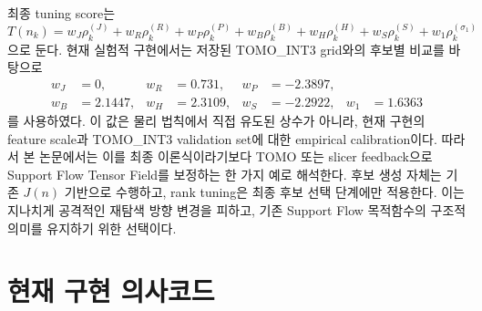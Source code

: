 \documentclass[11pt,a4paper]{article}
\begin{document}
최종 tuning score는
\begin{equation}
T(n_k)
=
w_J\rho^{(J)}_k
+w_R\rho^{(R)}_k
+w_P\rho^{(P)}_k
+w_B\rho^{(B)}_k
+w_H\rho^{(H)}_k
+w_S\rho^{(S)}_k
+w_1\rho^{(\sigma_1)}_k
\end{equation}
으로 둔다.
현재 실험적 구현에서는 저장된 TOMO\_INT3 grid와의 후보별 비교를 바탕으로
\begin{equation}
\begin{aligned}
w_J&=0, &
w_R&=0.731, &
w_P&=-2.3897,\\
w_B&=2.1447, &
w_H&=2.3109, &
w_S&=-2.2922, &
w_1&=1.6363
\end{aligned}
\end{equation}
를 사용하였다.
이 값은 물리 법칙에서 직접 유도된 상수가 아니라,
현재 구현의 feature scale과 TOMO\_INT3 validation set에 대한 empirical calibration이다.
따라서 본 논문에서는 이를 최종 이론식이라기보다
TOMO 또는 slicer feedback으로 Support Flow Tensor Field를 보정하는 한 가지 예로 해석한다.
후보 생성 자체는 기존 $J(n)$ 기반으로 수행하고,
rank tuning은 최종 후보 선택 단계에만 적용한다.
이는 지나치게 공격적인 재탐색 방향 변경을 피하고,
기존 Support Flow 목적함수의 구조적 의미를 유지하기 위한 선택이다.

\section{현재 구현 의사코드}
\end{document}
